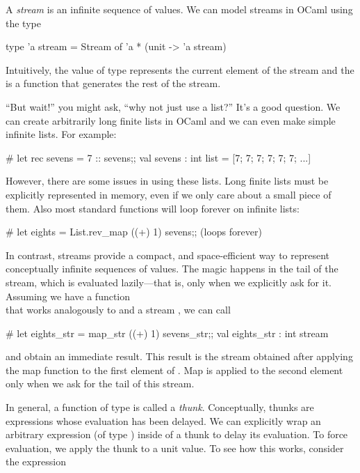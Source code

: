 \documentclass{pset}
\begin{document}
A \emph{stream} is an infinite sequence of values. We can model
streams in OCaml using the type
%
\begin{ocaml}
  type 'a stream = Stream of 'a * (unit -> 'a stream)
\end{ocaml}
%
Intuitively, the value of type  represents the current
element of the stream and the\\  is a function
that generates the rest of the stream.

``But wait!'' you might ask, ``why not just use a list?'' It's a good
question. We can create arbitrarily long finite lists in OCaml and we can
even make simple infinite lists. For example:
%
\begin{ocaml}
# let rec sevens = 7 :: sevens;;
val sevens : int list =
  [7; 7; 7; 7; 7; 7; ...]
\end{ocaml}
%
However, there are some issues in using these lists. Long finite lists
must be explicitly represented in memory, even if we only care about a
small piece of them. Also most standard functions will loop forever on infinite
lists:
%
\begin{ocaml}
# let eights = List.rev_map ((+) 1) sevens;;
(loops forever)
\end{ocaml}
%
In contrast, streams provide a compact, and space-efficient way to
represent conceptually infinite sequences of values. The magic happens
in the tail of the stream, which is evaluated lazily---that is, only
when we explicitly ask for it.  Assuming we have a function\\
 that works
analogously to  and a stream , we can
call
\begin{ocaml}
# let eights_str = map_str ((+) 1) sevens_str;;
val eights_str : int stream
\end{ocaml}
and obtain an immediate result. This result is the stream obtained
after applying the map function to the first element of .
Map is applied to the second element only when we ask for the tail of 
this stream.

In general, a function of type  is called a
\emph{thunk}. Conceptually, thunks are expressions whose evaluation
has been delayed. We can explicitly wrap an arbitrary expression (of
type ) inside of a thunk to delay its evaluation.  To force
evaluation, we apply the thunk to a unit value. To see how this works,
consider the expression
\end{document}
